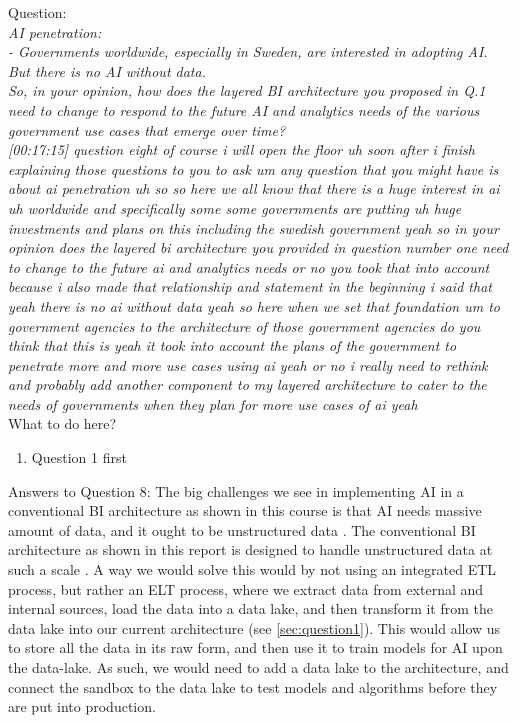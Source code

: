 Question:\\
\emph{
    AI penetration:\\
- Governments worldwide, especially in Sweden, are interested in adopting AI.
But there is no AI without data.\\ So, in your opinion, how does the layered BI
architecture you proposed in Q.1 need to change to respond to the future AI and
analytics needs of the various government use cases that emerge over time?
}\\

\emph{[00:17:15] question eight of course i will open the floor uh soon after i
finish explaining those questions to you to ask um any question that you might have is about ai penetration
uh so so here we all know that there is a huge interest in ai uh worldwide and specifically some
some governments are putting uh huge investments and plans on this including the swedish government
yeah so in your opinion does the layered bi architecture you provided in question number
one need to change to the future ai and analytics needs or no you took that into account because i also
made that relationship and statement in the beginning i said that yeah there is no ai without data
yeah so here when we set that foundation um to government agencies to the architecture of those government
agencies do you think that this is yeah it took into account the plans of the government to penetrate
more and more use cases using ai yeah or no i really need to rethink and probably add another component
to my layered architecture to cater to the needs of governments when they plan for more use cases
of ai yeah}\\

What to do here?
\begin{enumerate}
    \item Question 1 first
  \end{enumerate}

\newpage Answers to Question 8:
The big challenges we see in implementing AI in a conventional BI architecture as shown in this course is that AI needs massive amount of data, 
and it ought to be unstructured data \cite{IBM_Structured_vs_Unstructured_Data}.
The conventional BI architecture as shown in this report is designed to handle unstructured data at such a scale \cite{Data_Lakes_Article}.
A way we would solve this would by not using an integrated ETL process, but rather an ELT process, where we extract data from external and internal sources,
load the data into a data lake, and then transform it from the data lake \cite{ETL_vs_ELT} into our current architecture (see \ref{sec:question1}).
This would allow us to store all the data in its raw form, and then use it to train models for AI upon the data-lake.
As such, we would need to add a data lake to the architecture, and connect the sandbox to the data lake to test models and 
algorithms before they are put into production.

